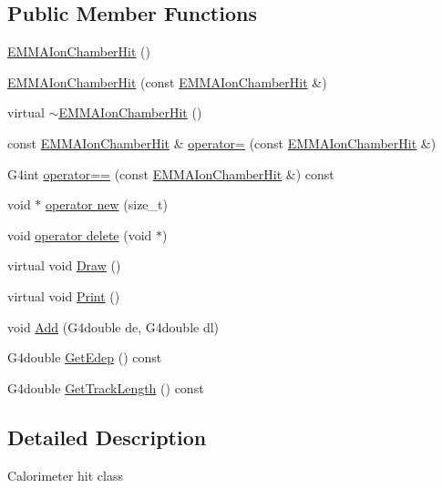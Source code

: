 \subsection*{Public Member Functions}
\begin{DoxyCompactItemize}
\item 
\hyperlink{classEMMAIonChamberHit_ad75cfe53db42c1240ec128d092502e26}{E\+M\+M\+A\+Ion\+Chamber\+Hit} ()
\item 
\hyperlink{classEMMAIonChamberHit_a03c3e59efa7a8abfc4294613d6faf345}{E\+M\+M\+A\+Ion\+Chamber\+Hit} (const \hyperlink{classEMMAIonChamberHit}{E\+M\+M\+A\+Ion\+Chamber\+Hit} \&)
\item 
virtual \hyperlink{classEMMAIonChamberHit_afd35a6db52837d8d218062d3bcfe1afc}{$\sim$\+E\+M\+M\+A\+Ion\+Chamber\+Hit} ()
\item 
const \hyperlink{classEMMAIonChamberHit}{E\+M\+M\+A\+Ion\+Chamber\+Hit} \& \hyperlink{classEMMAIonChamberHit_ad3777b164c0d892b2e313ee7cc5250d3}{operator=} (const \hyperlink{classEMMAIonChamberHit}{E\+M\+M\+A\+Ion\+Chamber\+Hit} \&)
\item 
G4int \hyperlink{classEMMAIonChamberHit_a722ef0deb569abe0db3b2edc57bf0218}{operator==} (const \hyperlink{classEMMAIonChamberHit}{E\+M\+M\+A\+Ion\+Chamber\+Hit} \&) const 
\item 
void $\ast$ \hyperlink{classEMMAIonChamberHit_a8a1a1579a39cf66b06c5250082fa9211}{operator new} (size\+\_\+t)
\item 
void \hyperlink{classEMMAIonChamberHit_abadf1dbdcf33fb515226e1acb5ceb0bd}{operator delete} (void $\ast$)
\item 
virtual void \hyperlink{classEMMAIonChamberHit_a2119bc84fec4904d53bf88e154983605}{Draw} ()
\item 
virtual void \hyperlink{classEMMAIonChamberHit_a41a76101e2f0faf2201e6fd5792254cd}{Print} ()
\item 
void \hyperlink{classEMMAIonChamberHit_af688556d82929479e004e0b87568ecfd}{Add} (G4double de, G4double dl)
\item 
G4double \hyperlink{classEMMAIonChamberHit_a860a0546567cd25f41f9a28c48dd913a}{Get\+Edep} () const 
\item 
G4double \hyperlink{classEMMAIonChamberHit_a90dfd4ddd328e40aa2294eab4ee30ec3}{Get\+Track\+Length} () const 
\end{DoxyCompactItemize}


\subsection{Detailed Description}
Calorimeter hit class

